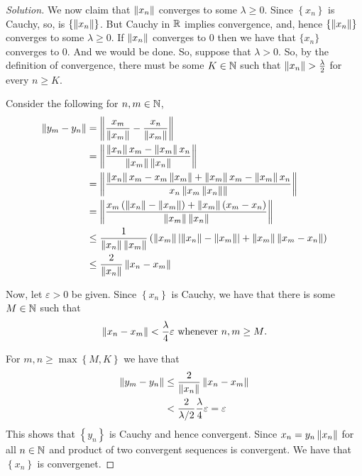 \begin{proof}[Solution]
    We now claim that $\left\lVert x_{n} \right\rVert$ converges to some $\lambda \ge 0$. Since $\left\{ x_{n} \right\}$ is Cauchy, so, is $\left\{ \left\lVert x_{n} \right\rVert \right\}$. But Cauchy in $\mathbb R$ implies convergence, and, hence $\left\{ \left\lVert x_{n} \right\rVert \right\}$ converges to some $\lambda \ge 0$. If $\left\lVert x_{n} \right\rVert$ converges to $0$ then we have that $\{ x_{n} \}$ converges to $0$. And we would be done. So, suppose that $\lambda > 0$. So, by the definition of convergence, there must be some $K \in \mathbb N$ such that $\left\lVert x_{n} \right\rVert > \frac{\lambda}{2}$ for every $n \ge K$.

Consider the following for $n, m \in \mathbb N$,
\begin{align*}
    \left\lVert y_{m} - y_{n} \right\rVert &=  \left\lVert \frac{x_{m}}{\left\lVert x_{m} \right\rVert} - \frac{x_{n}}{\left\lVert x_{m} \right\rVert} \right\rVert \\
    &= \left\lVert \frac{\left\lVert x_{n} \right\rVert x_{m} - \left\lVert x_m \right\rVert x_{n}}{\left\lVert x_{m} \right\rVert\left\lVert x_{n} \right\rVert} \right\rVert \\
    &= \left\lVert \frac{\left\lVert x_{n} \right\rVert x_{m} - x_{m} \left\lVert x_{m} \right\rVert + \left\lVert x_{m} \right\rVert x_{m} - \left\lVert x_{m} \right\rVert x_{n}}{x_{n}\left\lVert x_{m}\left\lVert x_n \right\rVert \right\rVert}  \right\rVert \\
    &= \left\lVert \frac{x_{m} \left( \left\lVert x_{n} \right\rVert - \left\lVert x_m \right\rVert \right) + \left\lVert x_m \right\rVert \left( x_{m} -x_{n} \right)}{\left\lVert x_{m} \right\rVert\left\lVert x_{n} \right\rVert} \right\rVert \\
    &\le \frac{1}{\left\lVert x_{n} \right\rVert\left\lVert x_{m} \right\rVert} \left( \left\lVert x_{m} \right\rVert \left\lvert \left\lVert x_{n} \right\rVert - \left\lVert x_{m} \right\rVert \right\rvert + \left\lVert x_{m} \right\rVert \left\lVert x_{m} - x_{n} \right\rVert \right) \\
    & \le \frac{2}{\left\lVert x_{n} \right\rVert} \left\lVert x_{n} - x_{m} \right\rVert
\end{align*}

    Now, let $\varepsilon > 0$ be given. Since $\left\{ x_{n} \right\}$ is Cauchy, we have that there is some $M \in \mathbb N$ such that 
    \begin{align*}
	\left\lVert x_{n} - x_{m} \right\rVert < \frac{\lambda}{4} \varepsilon \text{ whenever } n,m \ge M\text{.}
    \end{align*}

    For $m,n \ge \max \left\{ M,K \right\}$ we have that
    \begin{align*}
	\left\lVert y_{m} - y_{n} \right\rVert &\le \frac{2}{\left\lVert x_{n} \right\rVert} \left\lVert x_{n} - x_{m} \right\rVert \\
	& < \frac{2}{\lambda/2} \frac{\lambda}{4} \varepsilon = \varepsilon
    \end{align*}
    This shows that $\left\{ y_{n} \right\}$ is Cauchy and hence convergent. Since $x_{n} = y_{n} \left\lVert x_{n} \right\rVert$ for all $n\in \mathbb N$ and product of two convergent sequences is convergent. We have that $\left\{ x_{n} \right\}$ is convergenet.
\end{proof}
